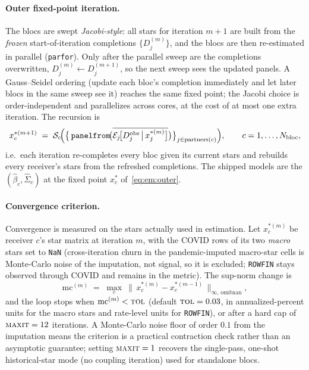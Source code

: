 \documentclass[11pt]{article}
\theoremstyle{definition}
\theoremstyle{remark}
\begin{document}
\paragraph{Outer fixed-point iteration.} The blocs are swept \emph{Jacobi-style}:
all stars for iteration $m{+}1$ are built from the \emph{frozen}
start-of-iteration completions $\{D^{(m)}_j\}$, and the blocs are then re-estimated
in parallel (\texttt{parfor}). Only after the parallel sweep are the completions
overwritten, $D^{(m)}_j\!\leftarrow\!D^{(m+1)}_j$, so the next sweep sees the
updated panels. A Gauss--Seidel ordering (update each bloc's completion
immediately and let later blocs in the same sweep see it) reaches the same fixed
point; the Jacobi choice is order-independent and parallelizes across cores, at
the cost of at most one extra iteration. The recursion is
\begin{equation}\label{eq:em:outer}
  x^{*(m+1)}_c \;=\; \mathcal{S}_c\!\Bigl(\bigl\{\,\texttt{panelfrom}\!\bigl(
     \overline{\mathcal{E}_j\!\bigl[D^{\text{obs}}_j \,\big|\, x^{*(m)}_j\bigr]}
   \bigr)\bigr\}_{j\in\text{partners}(c)}\Bigr),
  \qquad c=1,\dots,N_{\text{bloc}},
\end{equation}
i.e.\ each iteration re-completes every bloc given its current stars and rebuilds
every receiver's stars from the refreshed completions. The shipped models are the
$(\hat\beta_c,\hat\Sigma_c)$ at the fixed point $x^{*}_c$ of~\eqref{eq:em:outer}.

\paragraph{Convergence criterion.} Convergence is measured on the stars actually
used in estimation. Let $x^{*(m)}_c$ be receiver $c$'s star matrix at iteration
$m$, with the COVID rows of its two \emph{macro} stars set to \texttt{NaN}
(cross-iteration churn in the pandemic-imputed macro-star cells is Monte-Carlo
noise of the imputation, not signal, so it is excluded; \texttt{ROWFIN} stays
observed through COVID and remains in the metric). The sup-norm change is
\begin{equation}\label{eq:em:conv}
  \mathrm{mc}^{(m)}
  \;=\; \max_{c}\ \bigl\|\,x^{*(m)}_c - x^{*(m-1)}_c\,\bigr\|_{\infty,\,\text{omitnan}},
\end{equation}
and the loop stops when $\mathrm{mc}^{(m)}<\textsc{tol}$ (default
$\textsc{tol}=0.03$, in annualized-percent units for the macro stars and
rate-level units for \texttt{ROWFIN}), or after a hard cap of $\textsc{maxit}=12$
iterations. A Monte-Carlo noise floor of order $0.1$ from the imputation means
the criterion is a practical contraction check rather than an asymptotic
guarantee; setting $\textsc{maxit}=1$ recovers the single-pass, one-shot
historical-star mode (no coupling iteration) used for standalone blocs.
\end{document}
